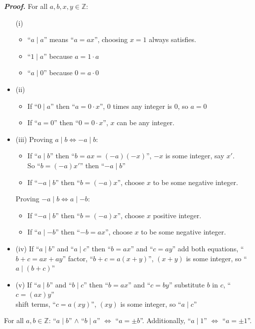 \noindent
\begin{Proof}[Theorem 1.1]
    \textit{\textbf{Proof.}} For all $a, b, x,y \in \mathbb{Z}$:
    \begin{itemize}
        \item[(i)]  \begin {itemize}
        \item ``$a\mid a$'' means ``$a = ax$'', choosing $x = 1$ always satisfies.
        \item ``$1\mid a$'' because $a = 1\cdot a$
        \item ``$a\mid 0$'' because $0 = a\cdot 0$
    \end{itemize}
    \item[(ii)] \begin {itemize}
    \item If ``$0\mid a$'' then ``$a = 0\cdot x$'', 0 times any integer is 0, so $a = 0$
    \item If ``$a = 0$'' then ``$0 = 0\cdot x$'', $x$ can be any integer.
    \end {itemize}

    \noindent
    \item[(iii)]
    Proving $a\mid b \Longleftrightarrow -a\mid b$:
    \begin{itemize}
        \item If ``$a\mid b$'' then ``$b = ax = (-a)(-x)$'', $-x$ is some integer, say $x'$.\\
              So ``$b = (-a)x'$'' then ``$-a\mid b$''
        \item If ``$-a\mid b$'' then ``$b = (-a)x$'', choose $x$ to be some negative integer.\\
    \end{itemize}
    \vspace{-1em}
    Proving $-a\mid b \Longleftrightarrow a\mid -b$:
    \begin{itemize}
        \item If ``$-a\mid b$'' then ``$b = (-a)x$'', choose $x$ positive integer.
        \item If ``$a\mid -b$'' then ``$-b = ax$'', choose $x$ to be some negative integer.
    \end{itemize}
    \item[(iv)] If ``$a\mid b$'' and ``$a\mid c$'' then ``$b = ax$'' and ``$c = ay$'' add both equations, ``$b+c = ax+ay$''
    factor, ``$b+c = a(x+y)$'', $(x+y)$ is some integer, so ``$a\mid (b+c)$''

    \item[(v)] If ``$a\mid b$'' and ``$b\mid c$'' then ``$b = ax$'' and ``$c = by$'' substitute $b$ in $c$, ``$c = (ax)y$''\\
    shift terms, ``$c = a(xy)$'', $(xy)$ is some integer, so ``$a\mid c$''
    \end{itemize}

\end{Proof}

\newpage

\begin {theo}

For all $a, b \in \mathbb{Z}$: ``$a \mid b$'' $\land$ ``$b \mid a$'' $\Longleftrightarrow$ ``$a = \pm b$''. Additionally, ``$a \mid 1$'' $\Longleftrightarrow$ ``$a = \pm 1$''.
\end{theo}

